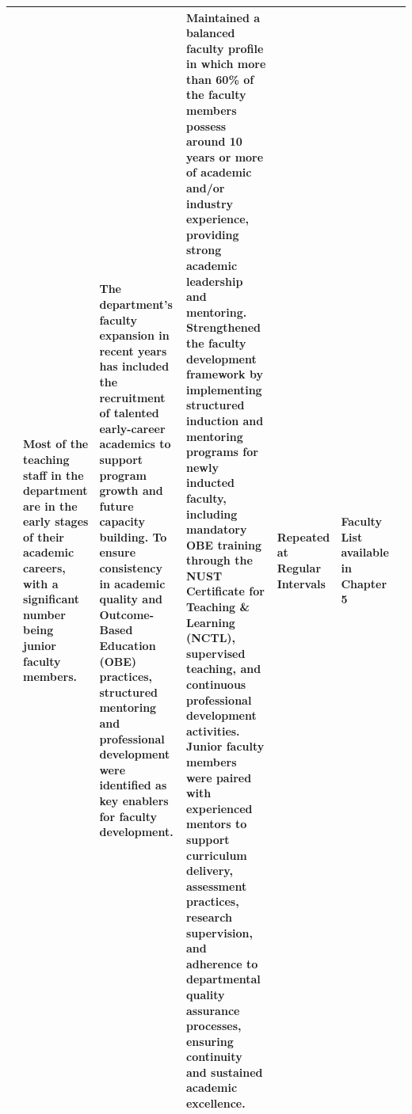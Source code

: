 \documentclass[10pt,a4paper]{article}
\begin{document}
\begin{longtable}{|P{2.3cm}|P{5.0cm}|P{4.5cm}|P{5.0cm}|P{2.4cm}|P{2.8cm}|P{1.8cm}|}
 & Most of the teaching staff in the department are in the early stages of their academic careers, with a significant number being junior faculty members. & The department's faculty expansion in recent years has included the recruitment of talented early-career academics to support program growth and future capacity building. To ensure consistency in academic quality and Outcome-Based Education (OBE) practices, structured mentoring and professional development were identified as key enablers for faculty development. & Maintained a balanced faculty profile in which more than 60\% of the faculty members possess around 10 years or more of academic and/or industry experience, providing strong academic leadership and mentoring. Strengthened the faculty development framework by implementing structured induction and mentoring programs for newly inducted faculty, including mandatory OBE training through the NUST Certificate for Teaching \& Learning (NCTL), supervised teaching, and continuous professional development activities. Junior faculty members were paired with experienced mentors to support curriculum delivery, assessment practices, research supervision, and adherence to departmental quality assurance processes, ensuring continuity and sustained academic excellence. & Repeated at Regular Intervals & Faculty List available in Chapter 5 &  \\ \hline

\end{longtable}
\end{document}
